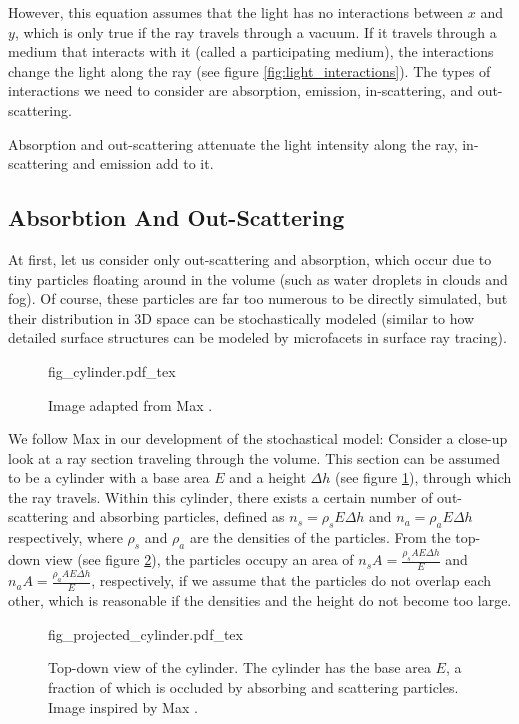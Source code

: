 However, this equation assumes that the light has no interactions between ${x}$ and ${y}$, which is only true if the ray travels through a vacuum. If it travels through a medium that interacts with it (called a participating medium), the interactions change the light along the ray\cite{10.5555/275458.275468} (see figure \ref{fig:light_interactions}). The types of interactions we need to consider are absorption, emission, in-scattering, and out-scattering\cite{468400}.

Absorption and out-scattering attenuate the light intensity along the ray, in-scattering and emission add to it.
\subsection{Absorbtion And Out-Scattering}
At first, let us consider only out-scattering and absorption, which occur due to tiny particles floating around in the volume (such as water droplets in clouds and fog).
Of course, these particles are far too numerous to be directly simulated, but their distribution in 3D space can be stochastically modeled (similar to how detailed surface structures can be modeled by microfacets \cite{10.1145/965141.563893} in surface ray tracing).

\begin{figure}
\centering
\def\svgwidth{\columnwidth}
{fig_cylinder.pdf_tex}

\caption{Image adapted from Max \cite{468400}.}
\label{fig:cylinder}
\end{figure}
We follow Max\cite{468400} in our development of the stochastical model: Consider a close-up look at a ray section traveling through the volume. This section can be assumed to be a cylinder with a base area $E$ and a height $\Delta h$ (see figure \ref{fig:cylinder}), through which the ray travels. Within this cylinder, there exists a certain number of out-scattering and absorbing particles, defined as $n_s={\rho}_sE{\Delta}h$ and $n_a={\rho}_aE{\Delta}h$ respectively, where ${\rho}_s$ and ${\rho}_a$ are the densities of the particles. From the top-down view (see figure \ref{fig:projected_cylinder}), the particles occupy an area of ${n_sA}=\frac{{\rho}_sAE{\Delta}h}{E}$ and ${n_aA}=\frac{{\rho}_aAE{\Delta}h}{E}$, respectively, if we assume that the particles do not overlap each other, which is reasonable if the densities and the height do not become too large.



\begin{figure}
\centering
\def\svgwidth{\columnwidth}
{fig_projected_cylinder.pdf_tex}

\caption{Top-down view of the cylinder. The cylinder has the base area $E$, a fraction of which is occluded by absorbing and scattering particles. Image inspired by Max \cite{468400}.}
\label{fig:projected_cylinder}
\end{figure}

